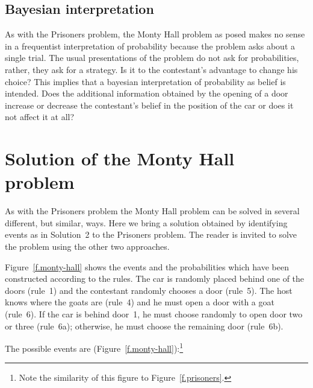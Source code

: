 \documentclass[11pt,a4paper]{article}
\begin{document}
\subsection*{Bayesian interpretation}

As with the Prisoners problem, the Monty Hall problem as posed makes no sense in a frequentist interpretation of probability because the problem asks about a single trial. The usual presentations of the problem do not ask for probabilities, rather, they ask for a strategy. Is it to the contestant's advantage to change his choice? This implies that a bayesian interpretation of probability as belief is intended. Does the additional information obtained by the opening of a door increase or decrease the contestant's belief in the position of the car or does it not affect it at all?


\section{Solution of the Monty Hall problem}

As with the Prisoners problem the Monty Hall problem can be solved in several different, but similar, ways. Here we bring a solution obtained by identifying events as in Solution~2 to the Prisoners problem. The reader is invited to solve the problem using the other two approaches.

Figure~\ref{f.monty-hall} shows the events and the probabilities which have been constructed according to the rules. The car is randomly placed behind one of the doors (rule~1) and the contestant randomly chooses a door (rule~5). The host knows where the goats are (rule~4) and he must open a door with a goat (rule~6). If the car is behind door~1, he must choose randomly to open door two or three (rule~6a); otherwise, he must choose the remaining door (rule~6b).

The possible events are (Figure~\ref{f.monty-hall}):\footnote{Note the similarity of this figure to Figure~\ref{f.prisoners}.}
\end{document}

